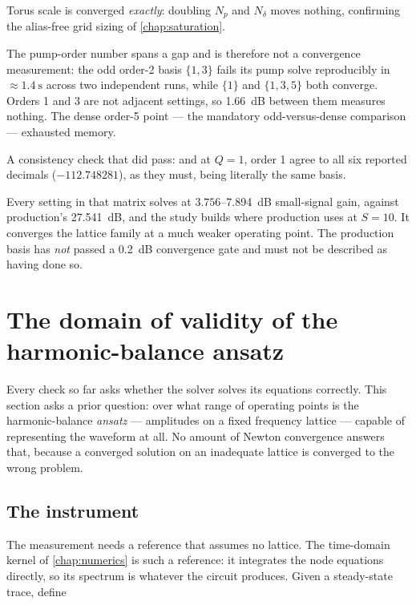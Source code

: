 Torus scale is converged \emph{exactly}: doubling $N_p$ and $N_\delta$ moves
nothing, confirming the alias-free grid sizing of \cref{chap:saturation}.

The pump-order number spans a gap and is therefore not a convergence
measurement: the odd order-2 basis $\{1,3\}$ fails its pump solve reproducibly
in $\approx\SI{1.4}{\second}$ across two independent runs, while $\{1\}$ and
$\{1,3,5\}$ both converge. Orders 1 and 3 are not adjacent settings, so
\SI{1.66}{\dB} between them measures nothing. The dense order-5 point --- the
mandatory odd-versus-dense comparison --- exhausted memory.

A consistency check that did pass:  and  at
$Q{=}1$, order 1 agree to all six reported decimals ($-112.748281$), as they must,
being literally the same basis.

\begin{caveat}
Every setting in that matrix solves at $3.756$--\SI{7.894}{\dB} small-signal
gain, against production's \SI{27.541}{\dB}, and the study builds
 where production uses
 at $S=10$. It converges the lattice family
at a much weaker operating point. The production basis has \emph{not} passed a
\SI{0.2}{\dB} convergence gate and must not be described as having done so.
\end{caveat}

\section{The domain of validity of the harmonic-balance ansatz}
\label{sec:ansatz-validity}

Every check so far asks whether the solver solves its equations correctly. This
section asks a prior question: over what range of operating points is the
harmonic-balance \emph{ansatz} --- amplitudes on a fixed frequency lattice ---
capable of representing the waveform at all. No amount of Newton convergence
answers that, because a converged solution on an inadequate lattice is
converged to the wrong problem.

\subsection{The instrument}

The measurement needs a reference that assumes no lattice. The time-domain
kernel of \cref{chap:numerics} is such a reference: it integrates the node
equations directly, so its spectrum is whatever the circuit produces. Given a
steady-state trace, define

